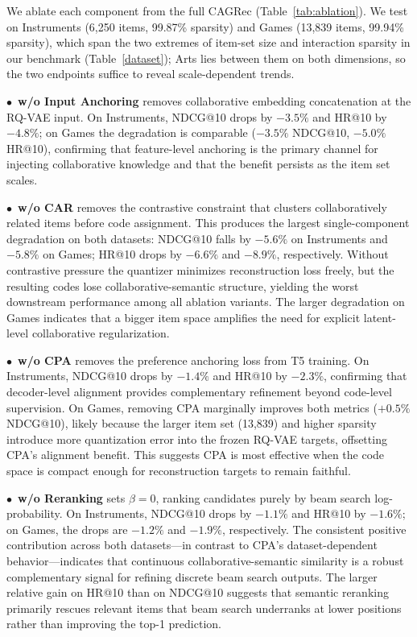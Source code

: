 \documentclass[sigconf, anonymous, review]{acmart}
\begin{document}
We ablate each component from the full CAGRec (Table~\ref{tab:ablation}).
%
We test on Instruments (6{,}250 items, 99.87\% sparsity) and Games (13{,}839 items, 99.94\% sparsity), which span the two extremes of item-set size and interaction sparsity in our benchmark (Table~\ref{dataset}); Arts lies between them on both dimensions, so the two endpoints suffice to reveal scale-dependent trends.

\noindent$\bullet$~\textbf{w/o Input Anchoring} removes collaborative embedding concatenation at the RQ-VAE input.
%
On Instruments, NDCG@10 drops by $-3.5\%$ and HR@10 by $-4.8\%$; on Games the degradation is comparable ($-3.5\%$ NDCG@10, $-5.0\%$ HR@10), confirming that feature-level anchoring is the primary channel for injecting collaborative knowledge and that the benefit persists as the item set scales.

\noindent$\bullet$~\textbf{w/o CAR} removes the contrastive constraint that clusters collaboratively related items before code assignment.
%
This produces the largest single-component degradation on both datasets: NDCG@10 falls by $-5.6\%$ on Instruments and $-5.8\%$ on Games; HR@10 drops by $-6.6\%$ and $-8.9\%$, respectively.
%
Without contrastive pressure the quantizer minimizes reconstruction loss freely, but the resulting codes lose collaborative-semantic structure, yielding the worst downstream performance among all ablation variants.
%
The larger degradation on Games indicates that a bigger item space amplifies the need for explicit latent-level collaborative regularization.

\noindent$\bullet$~\textbf{w/o CPA} removes the preference anchoring loss from T5 training.
%
On Instruments, NDCG@10 drops by $-1.4\%$ and HR@10 by $-2.3\%$, confirming that decoder-level alignment provides complementary refinement beyond code-level supervision.
%
On Games, removing CPA marginally improves both metrics ($+0.5\%$ NDCG@10), likely because the larger item set (13{,}839) and higher sparsity introduce more quantization error into the frozen RQ-VAE targets, offsetting CPA's alignment benefit.
%
This suggests CPA is most effective when the code space is compact enough for reconstruction targets to remain faithful.

\noindent$\bullet$~\textbf{w/o Reranking} sets $\beta\!=\!0$, ranking candidates purely by beam search log-probability.
%
On Instruments, NDCG@10 drops by $-1.1\%$ and HR@10 by $-1.6\%$; on Games, the drops are $-1.2\%$ and $-1.9\%$, respectively.
%
The consistent positive contribution across both datasets---in contrast to CPA's dataset-dependent behavior---indicates that continuous collaborative-semantic similarity is a robust complementary signal for refining discrete beam search outputs.
%
The larger relative gain on HR@10 than on NDCG@10 suggests that semantic reranking primarily rescues relevant items that beam search underranks at lower positions rather than improving the top-1 prediction.
\end{document}
